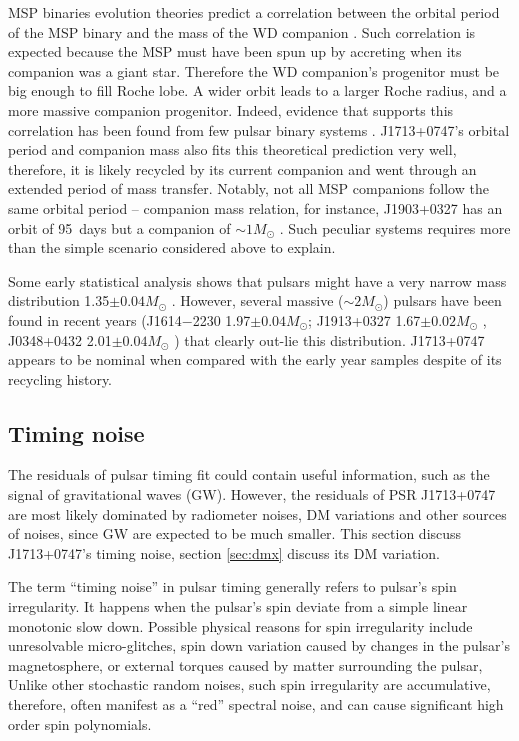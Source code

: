MSP binaries evolution theories predict 
a correlation between the orbital period
of the MSP binary and the mass of the WD companion \citep{rpj+95, ts99a, prp02b}
. Such correlation is expected because the MSP must have been spun up by
accreting when its companion was a giant star. Therefore the WD
companion's progenitor must be big enough to fill Roche lobe. A wider
orbit leads to a larger Roche radius, and a more massive companion progenitor.
Indeed, evidence that supports this correlation has been found from few pulsar
binary systems \citep{vbb+01, ktr94}.  
J1713+0747's orbital period and companion mass also fits this theoretical
prediction very well, therefore, it is likely recycled by its current
companion and went through an extended period of mass transfer.
Notably, not all MSP companions follow the same orbital period -- companion
mass relation, for instance, J1903+0327 has an orbit of 95~days but a
companion of $\sim 1M_{\odot}$ \citep{fbw+11}. Such peculiar systems requires
more than the simple scenario considered above to explain.

Some early statistical analysis shows that pulsars 
might have a very narrow mass distribution 1.35$\pm0.04M_{\odot}$ \citep{tc99}. 
However, several massive ($\sim2M_{\odot}$) pulsars have been found in recent
years (J1614$-$2230 1.97$\pm0.04M_{\odot}$\citealt{dpr+10}; J1913+0327
1.67$\pm0.02M_{\odot}$ \citealt{fbw+11}, J0348+0432 2.01$\pm0.04M_{\odot}$
\citealt{afw+13}) that clearly out-lie this distribution.
J1713+0747 appears to be nominal when compared with the early year samples
despite of its recycling history.

\subsection{Timing noise}
\label{sec:noise}
The residuals of pulsar timing fit could contain useful information,
such as the signal of gravitational waves (GW). However, the residuals of PSR
J1713+0747 are most likely dominated by radiometer noises, DM variations and other
sources of noises, since GW are expected 
to be much smaller.  This
section discuss J1713+0747's timing noise, section \ref{sec:dmx} discuss its DM
variation.


The term ``timing noise'' in pulsar timing generally refers to pulsar's spin irregularity.
It happens when the pulsar's spin deviate from a simple linear monotonic slow down.
Possible physical reasons for spin irregularity include unresolvable
micro-glitches, spin down variation caused by changes in the pulsar's
magnetosphere, or external torques caused by matter surrounding the pulsar,
Unlike other stochastic random noises, such spin irregularity are
accumulative, therefore, often manifest as a ``red'' spectral noise,
and can cause significant high order spin polynomials.

